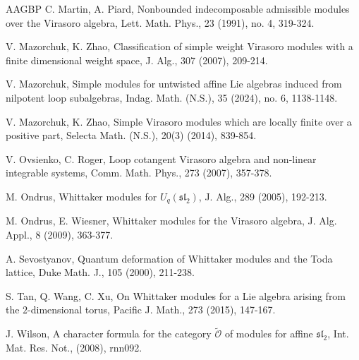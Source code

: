 \documentclass[12pt, a4paper]{amsart}
\theoremstyle{Theorem}
\theoremstyle{Theorem}
\numberwithin{equation}{section}
\begin{document}
\begin{thebibliography}{AAGBP}
C. Martin, A. Piard, Nonbounded indecomposable admissible modules over the
Virasoro algebra, Lett. Math. Phys., 23 (1991), no. 4, 319-324.



V. Mazorchuk, K. Zhao, Classification of simple weight Virasoro modules with
a finite dimensional weight space, J. Alg., 307 (2007), 209-214.

V. Mazorchuk, Simple modules for untwisted affine Lie algebras induced from nilpotent loop subalgebras,
Indag. Math. (N.S.), 35 (2024), no. 6, 1138-1148.



V. Mazorchuk, K. Zhao, Simple Virasoro modules which are locally finite over a positive part,
Selecta Math. (N.S.), 20(3) (2014), 839-854.

V. Ovsienko, C. Roger, Loop cotangent Virasoro algebra and non-linear integrable
systems, Comm. Math. Phys., 273 (2007), 357-378.


M. Ondrus, Whittaker modules for $U_q(\mathfrak{sl}_2)$, J. Alg., 289 (2005), 192-213.

M. Ondrus, E. Wiesner, Whittaker modules for the Virasoro algebra, J. Alg. Appl., 8 (2009), 363-377.



A. Sevostyanov, Quantum deformation of Whittaker modules and the Toda lattice, Duke Math. J., 105 (2000), 211-238.

S. Tan, Q. Wang, C. Xu, On Whittaker modules for a Lie algebra arising from the $2$-dimensional torus, Pacific J. Math.,
273 (2015), 147-167.




J. Wilson, A character formula for the category $\widetilde{\mathcal{O}}$ of modules for affine $\mathfrak{sl}_{2}$, Int. Mat.
Res. Not., (2008), rnn092.





\end{thebibliography}
\end{document}
